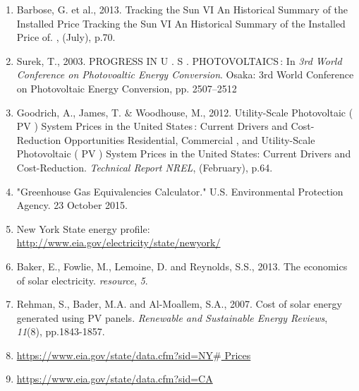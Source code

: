 \documentclass[12pt]{article}
\begin{document}
\begin{enumerate}
	\item Barbose, G. et al., 2013. Tracking the Sun VI An Historical Summary of the Installed Price Tracking the Sun VI An Historical Summary of the Installed Price of. , (July), p.70. \par

	\item Surek, T., 2003. PROGRESS IN U . S . PHOTOVOLTAICS : In \textit{3rd World Conference on Photovoaltic Energy Conversion}. Osaka: 3rd World Conference on Photovoltaic Energy Conversion, pp. 2507–2512\par

	\item Goodrich, A., James, T. $\&$  Woodhouse, M., 2012. Utility-Scale Photovoltaic ( PV ) System Prices in the United States : Current Drivers and Cost-Reduction Opportunities Residential, Commercial , and Utility-Scale Photovoltaic ( PV ) System Prices in the United States: Current Drivers and Cost-Reduction. \textit{Technical Report NREL}, (February), p.64.\par

	\item "Greenhouse Gas Equivalencies Calculator." U.S. Environmental Protection Agency. 23 October 2015.\par

	\item New York State energy profile: \href{http://www.eia.gov/electricity/state/newyork/}{http://www.eia.gov/electricity/state/newyork/}\par

	\item Baker, E., Fowlie, M., Lemoine, D. and Reynolds, S.S., 2013. The economics of solar electricity. \textit{resource}, \textit{5}.\par

	\item Rehman, S., Bader, M.A. and Al-Moallem, S.A., 2007. Cost of solar energy generated using PV panels. \textit{Renewable and Sustainable Energy Reviews}, \textit{11}(8), pp.1843-1857.\par

	\item \href{https://www.eia.gov/state/data.cfm?sid=NY}{https://www.eia.gov/state/data.cfm?sid=NY$\#$ Prices}\par

	\item \href{https://www.eia.gov/state/data.cfm?sid=CA}{https://www.eia.gov/state/data.cfm?sid=CA}\par


\end{enumerate}
\end{document}
